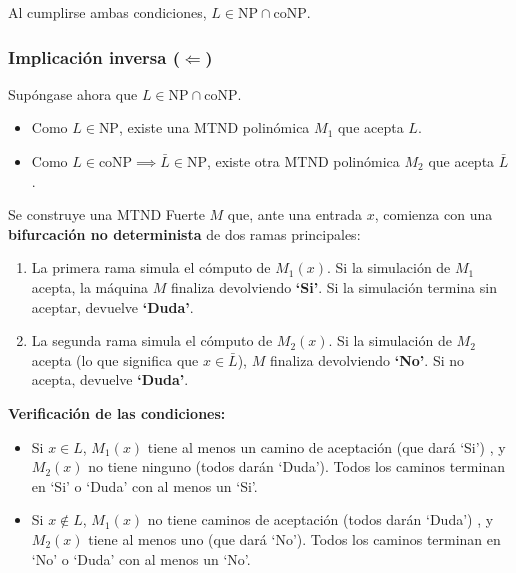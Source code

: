 \documentclass[12pt]{book} %
\begin{document}
Al cumplirse ambas condiciones, \(L \in \text{NP} \cap \text{coNP}\).

\hypertarget{implicaciuxf3n-inversa-leftarrow}{%
\subsubsection{\texorpdfstring{Implicación inversa
(\(\Leftarrow\))}{Implicación inversa (\textbackslash Leftarrow)}}\label{implicaciuxf3n-inversa-leftarrow}}

Supóngase ahora que \(L \in \text{NP} \cap \text{coNP}\).

\begin{itemize}
\item
  Como \(L \in \text{NP}\), existe una MTND polinómica \(M_1\) que
  acepta \(L\).
\item
  Como \(L \in \text{coNP} \implies \bar{L} \in \text{NP}\), existe otra
  MTND polinómica \(M_2\) que acepta \(\bar{L}\).
\end{itemize}

Se construye una MTND Fuerte \(M\) que, ante una entrada \(x\), comienza
con una \textbf{bifurcación no determinista} de dos ramas principales:

\begin{enumerate}
\def\labelenumi{\arabic{enumi}.}
\item
  La primera rama simula el cómputo de \(M_1(x)\). Si la simulación de
  \(M_1\) acepta, la máquina \(M\) finaliza devolviendo \textbf{`Si'}.
  Si la simulación termina sin aceptar, devuelve \textbf{`Duda'}.
\item
  La segunda rama simula el cómputo de \(M_2(x)\). Si la simulación de
  \(M_2\) acepta (lo que significa que \(x \in \bar{L}\)), \(M\)
  finaliza devolviendo \textbf{`No'}. Si no acepta, devuelve
  \textbf{`Duda'}.
\end{enumerate}

\textbf{Verificación de las condiciones:}

\begin{itemize}
\item
  Si \(x \in L\), \(M_1(x)\) tiene al menos un camino de aceptación (que
  dará `Si') , y \(M_2(x)\) no tiene ninguno (todos darán `Duda'). Todos
  los caminos terminan en `Si' o `Duda' con al menos un `Si'.
\item
  Si \(x \notin L\), \(M_1(x)\) no tiene caminos de aceptación (todos
  darán `Duda') , y \(M_2(x)\) tiene al menos uno (que dará `No'). Todos
  los caminos terminan en `No' o `Duda' con al menos un `No'.
\end{itemize}
\end{document}
